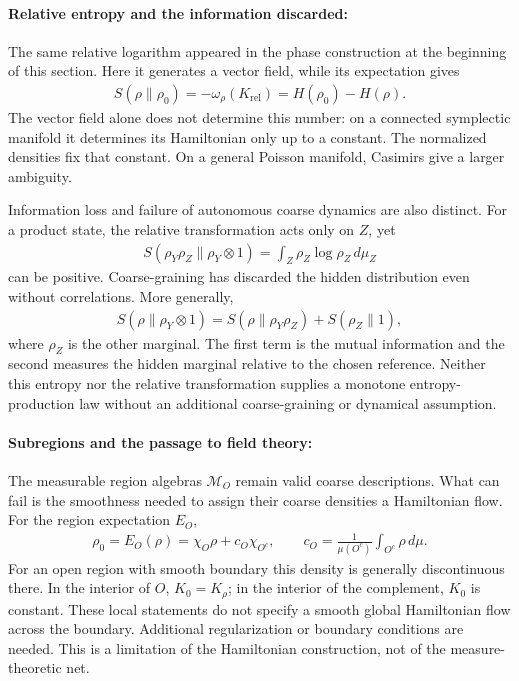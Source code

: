 \documentclass[a4paper,11pt]{article}
\theoremstyle{definition}
\begin{document}
\paragraph{Relative entropy and the information discarded:}
The same relative logarithm appeared in the phase construction at the beginning of this section. Here it generates a vector field, while its expectation gives
\begin{align}\label{eq:classical-relative-entropy-Hamiltonian}
    S(\rho\|\rho_0)=-\omega_\rho(K_{\mathrm{rel}})
    =H(\rho_0)-H(\rho).
\end{align}
The vector field alone does not determine this number: on a connected symplectic manifold it determines its Hamiltonian only up to a constant. The normalized densities fix that constant. On a general Poisson manifold, Casimirs give a larger ambiguity.

Information loss and failure of autonomous coarse dynamics are also distinct. For a product state, the relative transformation acts only on $Z$, yet
\begin{align}
    S(\rho_Y\rho_Z\|\rho_Y\otimes1)
    =\int_Z\rho_Z\log\rho_Z\,d\mu_Z
\end{align}
can be positive. Coarse-graining has discarded the hidden distribution even without correlations. More generally,
\begin{align}
    S(\rho\|\rho_Y\otimes1)
    =S(\rho\|\rho_Y\rho_Z)+S(\rho_Z\|1),
\end{align}
where $\rho_Z$ is the other marginal. The first term is the mutual information and the second measures the hidden marginal relative to the chosen reference. Neither this entropy nor the relative transformation supplies a monotone entropy-production law without an additional coarse-graining or dynamical assumption.

\paragraph{Subregions and the passage to field theory:}
The measurable region algebras $\mathcal M_O$ remain valid coarse descriptions. What can fail is the smoothness needed to assign their coarse densities a Hamiltonian flow. For the region expectation $E_O$,
\begin{align}
    \rho_0=E_O(\rho)=\chi_O\rho+c_O\chi_{O^c},\qquad
    c_O=\frac{1}{\mu(O^c)}\int_{O^c}\rho\,d\mu.
\end{align}
For an open region with smooth boundary this density is generally discontinuous there. In the interior of $O$, $K_0=K_\rho$; in the interior of the complement, $K_0$ is constant. These local statements do not specify a smooth global Hamiltonian flow across the boundary. Additional regularization or boundary conditions are needed. This is a limitation of the Hamiltonian construction, not of the measure-theoretic net.
\end{document}
